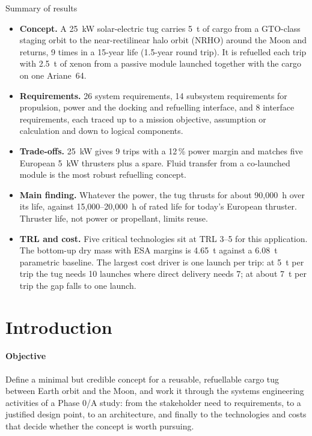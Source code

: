 \documentclass[11pt,a4paper]{article}
\begin{document}
\begin{keybox}{Summary of results}
\small
\begin{itemize}[leftmargin=1.1em]
  \item \textbf{Concept.} A 25~kW solar-electric tug carries 5~t of cargo from a GTO-class staging orbit to the near-rectilinear halo orbit (NRHO) around the Moon and returns, 9 times in a 15-year life (1.5-year round trip). It is refuelled each trip with 2.5~t of xenon from a passive module launched together with the cargo on one Ariane~64.
  \item \textbf{Requirements.} 26 system requirements, 14 subsystem requirements for propulsion, power and the docking and refuelling interface, and 8 interface requirements, each traced up to a mission objective, assumption or calculation and down to logical components.
  \item \textbf{Trade-offs.} 25~kW gives 9 trips with a 12\,\% power margin and matches five European 5~kW thrusters plus a spare. Fluid transfer from a co-launched module is the most robust refuelling concept.
  \item \textbf{Main finding.} Whatever the power, the tug thrusts for about 90,000~h over its life, against 15,000--20,000~h of rated life for today's European thruster. Thruster life, not power or propellant, limits reuse.
  \item \textbf{TRL and cost.} Five critical technologies sit at TRL 3--5 for this application. The bottom-up dry mass with ESA margins is 4.65~t against a 6.08~t parametric baseline. The largest cost driver is one launch per trip: at 5~t per trip the tug needs 10 launches where direct delivery needs 7; at about 7~t per trip the gap falls to one launch.
\end{itemize}
\end{keybox}

\newpage
{\small\tableofcontents}
\vspace{4pt}

\newpage
\section{Introduction}

\paragraph{Objective} Define a minimal but credible concept for a reusable, refuellable cargo tug between Earth orbit and the Moon, and work it through the systems engineering activities of a Phase 0/A study: from the stakeholder need to requirements, to a justified design point, to an architecture, and finally to the technologies and costs that decide whether the concept is worth pursuing.
\end{document}
